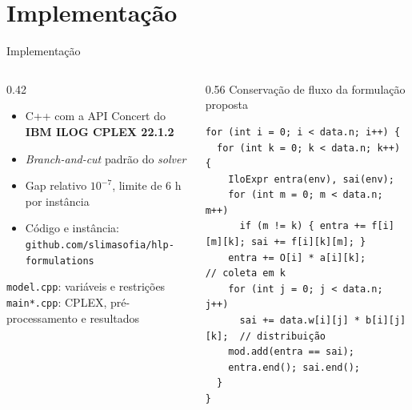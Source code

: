 \documentclass[aspectratio=169, 10pt]{beamer}
\begin{document}
\section{Implementação}

\begin{frame}[fragile]{Implementação}
  \begin{columns}[T]
    \begin{column}{0.42\textwidth}
      \small
      \begin{itemize}
        \item C++ com a API Concert do \textbf{IBM ILOG CPLEX 22.1.2}
        \item \textit{Branch-and-cut} padrão do \textit{solver}
        \item Gap relativo $10^{-7}$, limite de 6 h por instância
        \item Código e instância: \\ {\scriptsize\texttt{github.com/slimasofia/hlp-formulations}}
      \end{itemize}
      \vspace{0.1cm}
      {\scriptsize
      \texttt{model.cpp}: variáveis e restrições\\
      \texttt{main*.cpp}: CPLEX, pré-processamento e resultados}
    \end{column}
    \begin{column}{0.56\textwidth}
      \centering
      {\scriptsize Conservação de fluxo da formulação proposta}
\begin{lstlisting}
for (int i = 0; i < data.n; i++) {
  for (int k = 0; k < data.n; k++) {
    IloExpr entra(env), sai(env);
    for (int m = 0; m < data.n; m++)
      if (m != k) { entra += f[i][m][k]; sai += f[i][k][m]; }
    entra += O[i] * a[i][k];             // coleta em k
    for (int j = 0; j < data.n; j++)
      sai += data.w[i][j] * b[i][j][k];  // distribuição
    mod.add(entra == sai);
    entra.end(); sai.end();
  }
}
\end{lstlisting}
    \end{column}
  \end{columns}
\end{frame}
\end{document}
